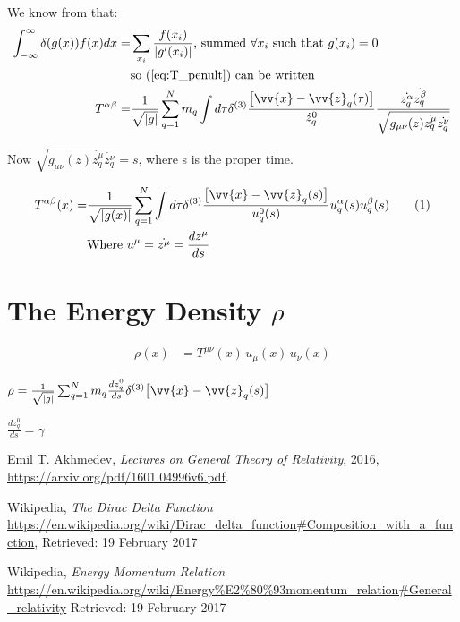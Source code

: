 \documentclass[]{article}
\newcommand\numberthis{\addtocounter{equation}{1}\tag{\theequation}}
\begin{document}
We know from \cite{wiki_delta} that:
\begin{align*}
\int_{-\infty}^{\infty} \delta(g(x)) f(x) dx  =& \sum_{x_i} \frac{f(x_i)}{|g'(x_i)|} \text{, summed $ \forall x_i$ such that $g(x_i)=0$}\\
&\text{so (\ref{eq:T_penult}) can be written}\\
 T^{\alpha\beta} =& \frac{1}{\sqrt{|g|}} \sum_{q=1}^{N} m_q \int d\tau \delta^{(3)} \frac{\big[\vv{x}-\vv{z}_q(\tau)\big]}{\dot{z}_q^0}\frac{\dot{z_q^\alpha}  \dot{z_q^\beta}}{\sqrt{g_{\mu\nu}(z)\dot{z_q^\mu}\dot{z_q^\nu}}}
\end{align*}


Now $\sqrt{g_{\mu\nu}(z)\dot{z_q^\mu}\dot{z_q^\nu}}=s$, where s is the proper time.

\begin{align*}
T^{\alpha\beta}(x) =& \frac{1}{\sqrt{|g(x)|}} \sum_{q=1}^{N} \int d\tau \delta^{(3)} \frac{\big[\vv{x}-\vv{z}_q(s)\big]}{u_q^0 (s)} u_q^\alpha (s) u_q^\beta (s)  \numberthis \label{eq:T}\\
&\text{Where $u^{\mu} = \dot{z^\mu} = \frac{d z^\mu}{d s}$}
\end{align*}





\section{The Energy Density $\rho$}

\begin{align}
\rho(x) &= T^{\mu\nu}(x) \, u_\mu(x) \, u_\nu(x)
\end{align}


$\rho = \frac{1}{\sqrt{|g|}} \sum_{q=1}^{N} m_q \frac{d z^0_q}{d s} \delta^{(3)} \big[\vv{x}-\vv{z}_q(s)\big]$ 

$\frac{d z^0_q}{d s}=\gamma$

\begin{thebibliography}{9}
	
	Emil T. Akhmedev,
	\emph{Lectures on General Theory of Relativity},
	2016,
	\url{https://arxiv.org/pdf/1601.04996v6.pdf}.
	
	Wikipedia,
	\emph{The Dirac Delta Function}
	\url{https://en.wikipedia.org/wiki/Dirac_delta_function#Composition_with_a_function},
	Retrieved: 19 February 2017
	
	Wikipedia,
	\emph{Energy Momentum Relation}
	\url{https://en.wikipedia.org/wiki/Energy%E2%80%93momentum_relation#General_relativity}
		Retrieved: 19 February 2017
\end{thebibliography}
\end{document}
